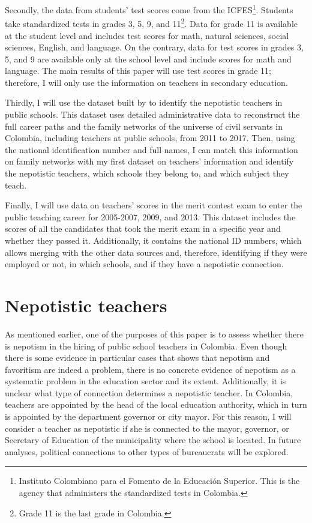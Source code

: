 \documentclass[12pt,runningheads]{article}
\begin{document}
Secondly, the data from students' test scores come from the ICFES\footnote{Instituto Colombiano para el Fomento de la Educación Superior. This is the agency that administers the standardized tests in Colombia.}. Students take standardized tests in grades 3, 5, 9, and 11\footnote{Grade 11 is the last grade in Colombia.}. Data for grade 11 is available at the student level and includes test scores for math, natural sciences, social sciences, English, and language. On the contrary, data for test scores in grades 3, 5, and 9 are available only at the school level and include scores for math and language. The main results of this paper will use test scores in grade 11; therefore, I will only use the information on teachers in secondary education. 

Thirdly, I will use the dataset built by \cite{Riano2021} to identify the nepotistic teachers in public schools. This dataset uses detailed administrative data to reconstruct the full career paths and the family networks of the universe of civil servants in Colombia, including teachers at public schools, from 2011 to 2017. Then, using the national identification number and full names, I can match this information on family networks with my first dataset on teachers' information and identify the nepotistic teachers, which schools they belong to, and which subject they teach.

Finally, I will use data on teachers' scores in the merit contest exam to enter the public teaching career for 2005-2007, 2009, and 2013. This dataset includes the scores of all the candidates that took the merit exam in a specific year and whether they passed it. Additionally, it contains the national ID numbers, which allows merging with the other data sources and, therefore, identifying if they were employed or not, in which schools, and if they have a nepotistic connection.

\section{Nepotistic teachers} 

As mentioned earlier, one of the purposes of this paper is to assess whether there is nepotism in the hiring of public school teachers in Colombia. Even though there is some evidence in particular cases that shows that nepotism and favoritism are indeed a problem, there is no concrete evidence of nepotism as a systematic problem in the education sector and its extent. Additionally, it is unclear what type of connection determines a nepotistic teacher. In Colombia, teachers are appointed by the head of the local education authority, which in turn is appointed by the department governor or city mayor. For this reason, I will consider a teacher as nepotistic if she is connected to the mayor, governor, or Secretary of Education of the municipality where the school is located. In future analyses, political connections to other types of bureaucrats will be explored.
\end{document}
